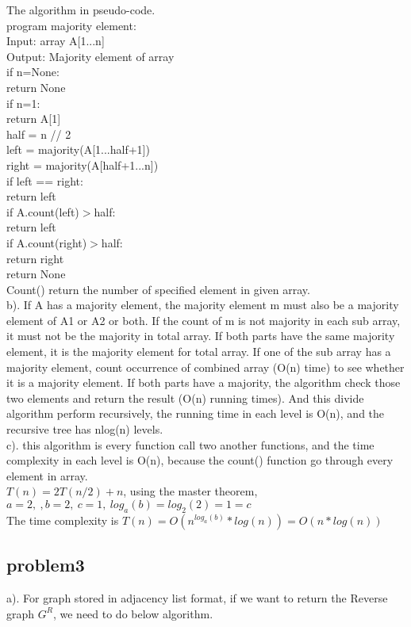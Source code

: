 \documentclass[11pt]{article}
\newcommand\tab[1][1cm]{\hspace*{#1}}
\begin{document}
The algorithm in  pseudo-code. \\
program majority element: \\
Input:  array A[1...n] \\
Output: Majority element of array \\
if n=None: \\
\tab return None \\
if n=1:\\
\tab return A[1]\\
half = n // 2 \\
left = majority(A[1...half+1]) \\
right = majority(A[half+1...n]) \\
if left == right: \\
\tab return left \\
if A.count(left)$>$half:\\
\tab return left\\
if A.count(right)$>$half:\\
\tab return right\\
return None\\
Count() return the number of specified element in given array. \\
b). If A has a majority element, the majority element m must also be a majority element of A1 or A2 or both. If the count of m is not majority in each sub array, it must not be the majority in total array. If both parts have the same majority element, it is the majority element for total array. If one of the sub array has a majority element, count occurrence of combined array (O(n) time) to see whether it is a majority element. If both parts have a majority, the algorithm check those two elements and return the result (O(n) running times). And this divide algorithm perform recursively, the running time in each level is O(n), and the recursive tree has nlog(n) levels. \\
c). this algorithm is every function call two another functions, and the time complexity in each level is O(n), because the count() function go through every element in array.\\
$T(n)=2T(n/2)+n$, using the master theorem, $a=2, \ , b=2, \ c=1, \ log_a(b)=log_2(2)=1=c$\\ The time complexity is $T(n)=O(n^{log_a(b)}*log(n))=O(n*log(n))$




\subsection{problem3}
a). For graph stored in adjacency list format, if we want to return the Reverse graph $G^R$, we need to do below algorithm. \\
\end{document}
